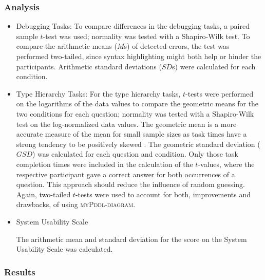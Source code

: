 \documentclass[runningheads]{llncs}
\newcommand{\mypddldiagram}{\textsc{myPddl-diagram}\xspace}
\begin{document}
\newpage
\subsubsection{Analysis}
\begin{itemize}
\item Debugging Tasks: To compare differences in the
  debugging tasks, a paired sample $t$-test was used; normality was
  tested with a Shapiro-Wilk test. To compare the arithmetic means
  ($M$s) of detected errors, the test was performed two-tailed, since
  syntax highlighting might both help or hinder the
  participants. Arithmetic standard deviations ($SD$s) were calculated
  for each condition.

\item Type Hierarchy Tasks:
\nopagebreak
  For the type hierarchy tasks, $t$-tests were performed on the
  logarithms of the data values to compare the geometric means for the
  two conditions for each question; normality was tested with a
  Shapiro-Wilk test on the log-normalized data values. The geometric
  mean is a more accurate measure of the mean for small sample sizes
  as task times have a strong tendency to be positively skewed
  \cite{sauro2012quantifying}. The geometric standard deviation
  ($GSD$) was calculated for each question and condition. Only those
  task completion times were included in the calculation of the
  $t$-values, where the respective participant gave a correct answer
  for both occurrences of a question. This approach should reduce the
  influence of random guessing. Again, two-tailed $t$-tests were used
  to account for both, improvements and drawbacks, of using
  \mypddldiagram.

\item System Usability Scale

  The arithmetic mean and standard deviation for the score on the
  System Usability Scale was calculated.
\end{itemize}

\subsubsection{Results}
\end{document}
